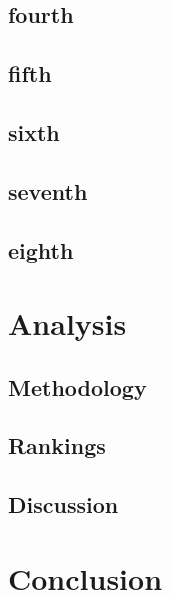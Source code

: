 \documentclass[titlepage]{article}
\begin{document}
	\subsection{fourth}
	\subsection{fifth}
	\subsection{sixth}
	\subsection{seventh}
	\subsection{eighth}

\section{Analysis}
	\subsection{Methodology}
	\subsection{Rankings}
	\subsection{Discussion}

\section{Conclusion}


\newpage

\nocite{*}
{}



\end{document}
